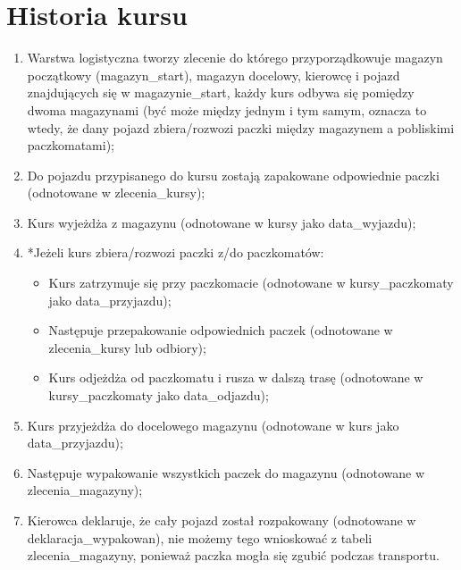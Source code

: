 \documentclass{article} %
\begin{document}
\section*{Historia kursu}
    \begin{enumerate}
        \item Warstwa logistyczna tworzy zlecenie do którego przyporządkowuje magazyn początkowy (magazyn\_start), magazyn docelowy, kierowcę i pojazd znajdujących się w magazynie\_start, każdy kurs odbywa się pomiędzy dwoma magazynami (być może między jednym i tym samym, oznacza to wtedy, że dany pojazd zbiera/rozwozi paczki między magazynem a pobliskimi paczkomatami);
        \item Do pojazdu przypisanego do kursu zostają zapakowane odpowiednie paczki (odnotowane w zlecenia\_kursy);
        \item Kurs wyjeżdża z magazynu (odnotowane w kursy jako data\_wyjazdu);
        \item *Jeżeli kurs zbiera/rozwozi paczki z/do paczkomatów:
            \begin{itemize}
                \item Kurs zatrzymuje się przy paczkomacie (odnotowane w kursy\_paczkomaty jako data\_przyjazdu);
                \item Następuje przepakowanie odpowiednich paczek (odnotowane w zlecenia\_kursy lub odbiory);
                \item Kurs odjeżdża od paczkomatu i rusza w dalszą trasę (odnotowane w kursy\_paczkomaty jako data\_odjazdu);
            \end{itemize}
        \item Kurs przyjeżdża do docelowego magazynu (odnotowane w kurs jako data\_przyjazdu);
        \item Następuje wypakowanie wszystkich paczek do magazynu (odnotowane w zlecenia\_magazyny);
        \item Kierowca deklaruje, że cały pojazd został rozpakowany (odnotowane w deklaracja\_wypakowan), nie możemy tego wnioskować z tabeli zlecenia\_magazyny, ponieważ paczka mogła się zgubić podczas transportu.
    \end{enumerate}
\end{document}
